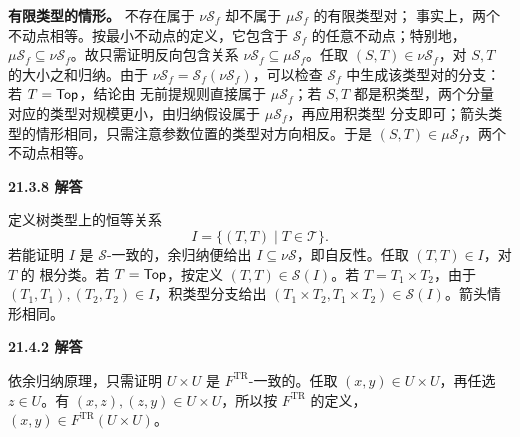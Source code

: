 \begin{taplauthorsolutionentrybox}
\textbf{有限类型的情形。}
不存在属于 \(\nu\mathcal S_f\) 却不属于 \(\mu\mathcal S_f\) 的有限类型对；
事实上，两个不动点相等。按最小不动点的定义，它包含于
\(\mathcal S_f\) 的任意不动点；特别地，
\(\mu\mathcal S_f\subseteq\nu\mathcal S_f\)。故只需证明反向包含关系
\(\nu\mathcal S_f\subseteq\mu\mathcal S_f\)。任取
\((S,T)\in\nu\mathcal S_f\)，对 \(S,T\) 的大小之和归纳。由于
\(\nu\mathcal S_f=\mathcal S_f(\nu\mathcal S_f)\)，可以检查
\(\mathcal S_f\) 中生成该类型对的分支：若 \(T=\mathsf{Top}\)，结论由
无前提规则直接属于 \(\mu\mathcal S_f\)；若 \(S,T\) 都是积类型，两个分量
对应的类型对规模更小，由归纳假设属于 \(\mu\mathcal S_f\)，再应用积类型
分支即可；箭头类型的情形相同，只需注意参数位置的类型对方向相反。于是
\((S,T)\in\mu\mathcal S_f\)，两个不动点相等。

\end{taplauthorsolutionentrybox}

\begin{taplauthorsolutionentrybox}
\label{sol:author:21.3.8}
\textbf{21.3.8 解答}

定义树类型上的恒等关系
\[
I=\{(T,T)\mid T\in\mathcal T\}.
\]
若能证明 \(I\) 是 \(\mathcal S\)-一致的，余归纳便给出
\(I\subseteq\nu\mathcal S\)，即自反性。任取 \((T,T)\in I\)，对 \(T\) 的
根分类。若 \(T=\mathsf{Top}\)，按定义
\((T,T)\in\mathcal S(I)\)。若 \(T=T_1\times T_2\)，由于
\((T_1,T_1),(T_2,T_2)\in I\)，积类型分支给出
\((T_1\times T_2,T_1\times T_2)\in\mathcal S(I)\)。箭头情形相同。

\end{taplauthorsolutionentrybox}

\begin{taplauthorsolutionentrybox}
\label{sol:author:21.4.2}
\textbf{21.4.2 解答}

依余归纳原理，只需证明 \(U\times U\) 是
\(F^{\operatorname{TR}}\)-一致的。任取 \((x,y)\in U\times U\)，再任选
\(z\in U\)。有 \((x,z),(z,y)\in U\times U\)，所以按
\(F^{\operatorname{TR}}\) 的定义，
\((x,y)\in F^{\operatorname{TR}}(U\times U)\)。

\end{taplauthorsolutionentrybox}

